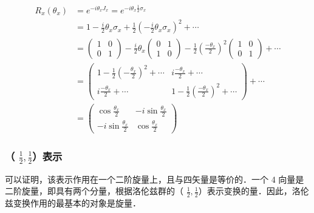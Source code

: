 \begin{equation}
\begin{aligned}
R_{x}\left(\theta_{x}\right) &=e^{-i \theta_{x} J_{x}}=e^{-i \theta_{x} \frac{1}{2} \sigma_{x}} \\
&=1-\frac{i}{2} \theta_{x} \sigma_{x}+\frac{1}{2}\left(-\frac{i}{2} \theta_{x} \sigma_{x}\right)^{2}+\cdots \\
&=\left(\begin{array}{cc}
1 & 0 \\
0 & 1
\end{array}\right)-\frac{i}{2} \theta_{x}\left(\begin{array}{cc}
0 & 1 \\
1 & 0
\end{array}\right)-\frac{1}{2}\left(\frac{-\theta_{x}}{2}\right)^{2}\left(\begin{array}{cc}
1 & 0 \\
0 & 1
\end{array}\right)+\cdots \\
&=\left(\begin{array}{cc}
1-\frac{1}{2}\left(-\frac{\theta_{x}}{2}\right)^{2}+\cdots & i \frac{-\theta_{x}}{2}+\cdots \\
i \frac{-\theta_{x}}{2}+\cdots & 1-\frac{1}{2}\left(\frac{-\theta_{x}}{2}\right)^{2}+\cdots
\end{array}\right)+\cdots \\
&=\left(\begin{array}{cc}
\cos \frac{\theta_{x}}{2} & -i \sin \frac{\theta_{x}}{2} \\
-i \sin \frac{\theta_{x}}{2} & \cos \frac{\theta_{x}}{2}
\end{array}\right)
\end{aligned}
\end{equation}
\subsubsection{（ $\frac{1}{2},\frac{1}{2}$）表示}
可以证明，该表示作用在一个二阶旋量上，且与四矢量是等价的．一个 4 向量是二阶旋量，即具有两个分量，根据洛伦兹群的（ $\frac{1}{2},\frac{1}{2}$）表示变换的量．因此，洛伦兹变换作用的最基本的对象是旋量．